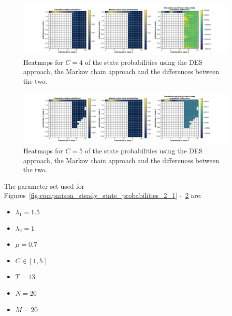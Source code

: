 \begin{figure}[H]
    \includegraphics[width=\textwidth, trim=100 10 100 10, clip]{chapters/03_queueing_model/Bin/numeric_results_and_timings/steady_state_probabilities_2/main_4.pdf}
    \caption{Heatmaps for \(C = 4\) of the state probabilities using the
    DES approach, the Markov chain approach and the differences between the
    two.}
    \label{fig:comparison_steady_state_probabilities_2_4}
\end{figure}

\begin{figure}[H]
    \includegraphics[width=\textwidth, trim=100 10 100 10, clip]{chapters/03_queueing_model/Bin/numeric_results_and_timings/steady_state_probabilities_2/main_5.pdf}
    \caption{Heatmaps for \(C = 5\) of the state probabilities using the
    DES approach, the Markov chain approach and the differences between the
    two.}
    \label{fig:comparison_steady_state_probabilities_2_5}
\end{figure}


The parameter set used for
Figures~\ref{fig:comparison_steady_state_probabilities_2_1}
-~\ref{fig:comparison_steady_state_probabilities_2_5} are:

\begin{multicols}{3}
    \begin{itemize}
        \item \(\lambda_1 = 1.5\)
        \item \(\lambda_2 = 1\)
        \item \(\mu = 0.7\)
        \item \(C \in [1, 5]\)
        \item \(T = 13\)
        \item \(N = 20\)
        \item \(M = 20\)
    \end{itemize}    
\end{multicols}


